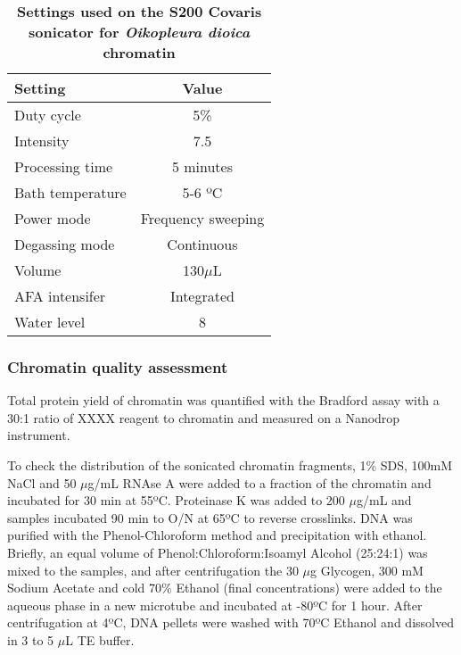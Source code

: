\documentclass[11pt,twoside,a4paper]{report}
\begin{document}
			\begin{table}[!ht]
        		\caption{\bf{Settings used on the S200 Covaris sonicator for \textit{Oikopleura dioica} chromatin}}
        		\begin{center}
        		\begin{tabular}{|l|c|}
            		\hline
	           		\textbf{Setting} & \textbf{Value}\\
        		    \hline
	        		Duty cycle& 5\%\\
	        		\hline
            	    Intensity & 7.5\\
	        		\hline
					Processing time & 5 minutes\\
	        		\hline
	        		Bath temperature & 5-6 ºC\\
	        		\hline
					Power mode & Frequency sweeping\\
	        		\hline
	        		Degassing mode & Continuous\\
	        		\hline
	        		Volume & 130$\mu$L\\
	        		\hline
	        		AFA intensifer & Integrated\\
	        		\hline
	        		Water level & 8\\
	        		\hline        		
	        \end{tabular}
    		    \end{center}
	        \label{table:CovarisSettings}
		    \end{table}
			
			\subsubsection{Chromatin quality assessment}
			\label{section:chromQualityAssess}
			Total protein yield of chromatin was quantified with the Bradford assay with a 30:1 ratio of XXXX reagent to chromatin and measured on a Nanodrop instrument.
			
			To check the distribution of the sonicated chromatin fragments, 1\% SDS, 100mM NaCl and 50 $\mu$g/mL RNAse A were added to a fraction of the chromatin and incubated for 30 min at 55ºC. Proteinase K was added to 200 $\mu$g/mL and samples incubated 90 min to O/N at 65ºC to reverse crosslinks. DNA was purified with the Phenol-Chloroform method and precipitation with ethanol. Briefly, an equal volume of Phenol:Chloroform:Isoamyl Alcohol (25:24:1) was mixed to the samples, and after centrifugation the 30 $\mu$g Glycogen, 300 mM Sodium Acetate and cold 70\% Ethanol (final concentrations) were added to the aqueous phase in a new microtube and incubated at -80ºC for 1 hour. After centrifugation at 4ºC, DNA pellets were washed with 70ºC Ethanol and dissolved in 3 to 5 $\mu$L TE buffer. \\
			
\end{document}
